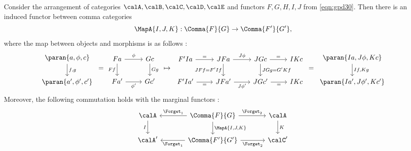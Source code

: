 \documentclass[12pt,oneside]{article}
\begin{document}
\begin{proposition}  \label{lem:gpd30}
	Consider the arrangement of categories $\calA, \calB, \calC, \calD, \calE$ and functors $F,G,H,I, J$ from \eqref{eqn:gpd30}. Then there is an induced functor between comma categories
	\begin{equation} \label{eqn:odl9}
		\MapA{I,J,K} : \Comma{F}{G} \to \Comma{F'}{G'}, 
	\end{equation}
	where the map between objects and morphisms is as follows :
	\[\begin{tikzcd} \paran{a, \phi, c} \arrow{d}{f,g} \\ \paran{a', \phi', c'} \end{tikzcd} \,=\, 
	\begin{tikzcd} Fa \arrow{d}[swap]{Ff} \arrow{r}{\phi} & Gc \arrow{d}{Gg} \\ Fa' \arrow{r}[swap]{\phi'} & Gc' \end{tikzcd} \;\mapsto\; 
	\begin{tikzcd} 
		F'Ia \arrow{r}{=} & JFa \arrow{d}[swap]{JFf = F'If} \arrow{r}{J\phi} & JGc \arrow{r}{=} \arrow{d}{JGg = G'Kf} & IKc \\ 
		F'Ia' \arrow{r}[swap]{=} & JFa' \arrow{r}[swap]{J\phi'} & JGc' \arrow{r}[swap]{=} & IKc
	\end{tikzcd} \,=\, 
	\begin{tikzcd} \paran{Ia, J\phi, Kc} \arrow{d}{If,Kg} \\ \paran{Ia', J\phi', Kc'} \end{tikzcd}\]
	Moreover, the following commutation holds with the marginal functors :
	\begin{equation} \label{eqn:dgbw}
		\begin{tikzcd} [column sep = large]
			\calA \arrow[d, "I"'] & \Comma{F}{G} \arrow[l, "\Forget_1"'] \arrow[r, "\Forget_2"] \arrow[d, "\MapA{I,J,K}"] & \calA \arrow[d, "K"] \\
			\calA' & \Comma{F'}{G'} \arrow[l, "\Forget_1"] \arrow[r, "\Forget_2"'] & \calC'  
		\end{tikzcd}
	\end{equation}
\end{proposition}
\end{document}
